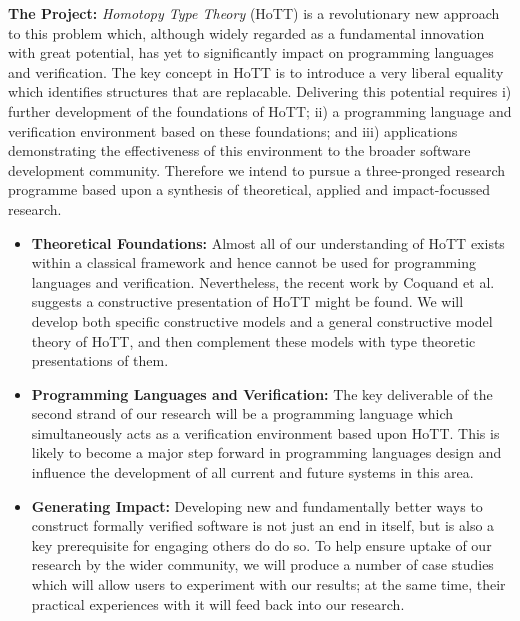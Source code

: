 \documentclass[a4paper,11pt]{article}
\begin{document}
{\bf The Project:} {\em Homotopy Type Theory} (HoTT) is a
revolutionary new approach to this problem which, although  widely regarded as
a fundamental innovation with great potential, has yet to 
significantly impact on programming languages and verification.
The key concept in HoTT is to introduce a very liberal equality which
identifies structures that are replacable. 
Delivering this potential requires i) further
development of the foundations of HoTT; ii)
a programming language and verification environment based on
these foundations; and iii) applications demonstrating the effectiveness
of this environment to the broader software development community.
Therefore we intend to pursue a three-pronged
research programme based upon a synthesis of theoretical, applied and
impact-focussed research.

\begin{itemize}
\item {\bf Theoretical Foundations:} Almost
  all of our understanding of HoTT exists within a classical
  framework and hence cannot be used for programming
  languages and verification. Nevertheless, the recent work by Coquand et al. suggests a
  constructive presentation of HoTT might be found. We will develop
  both specific constructive models and a general constructive model
  theory of HoTT, and then complement these models with type theoretic
  presentations of them. 
\item {\bf Programming Languages and Verification:} The key
  deliverable of the second strand of our research will be a
  programming language which simultaneously acts as a verification
  environment based upon HoTT. This is likely to become a major
  step forward in programming languages design and influence
  the development of all current and future systems in this area.
\item {\bf Generating Impact:} Developing new and fundamentally
  better ways to construct formally verified software is not just an
  end in itself, but is also a key prerequisite for engaging others do
  do so.  To help ensure uptake of our research by the wider
  community, we will produce a number of case studies which will allow
  users to experiment with our results; at the same time, their
  practical experiences with it will feed back into our research.
\end{itemize}
\end{document}

